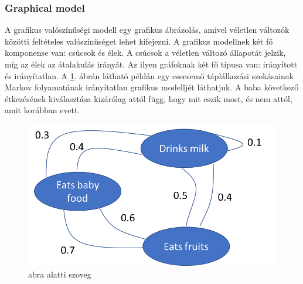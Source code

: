 \subsubsection{Graphical model}

A grafikus valószínűségi modell egy grafikus ábrázolás, amivel véletlen változók közötti feltételes valószínűséget lehet kifejezni. A grafikus modellnek két fő komponense van: csúcsok és élek. A csúcsok a véletlen változó állapotát jelzik, míg az élek az átalakulás irányát. Az ilyen gráfoknak két fő típusa van: irányított és irányítatlan. A \ref{fig:graph}. ábrán látható példán egy csecsemő táplálkozási szokásainak Markov folyamatának irányítatlan grafikus modelljét láthatjuk. A baba következő étkezésének kiválasztása kizárólag attól függ, hogy mit eszik most, és nem attól, amit korábban evett.

\begin{figure}[ht]
	\centering
	\includegraphics[width=0.7\columnwidth]{figures/graph_example.png}
	\caption{abra alatti szoveg}
	\label{fig:graph}
\end{figure}




